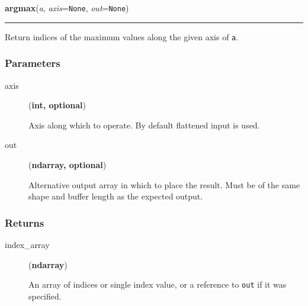     \begin{boxedminipage}{\textwidth}

    \raggedright \textbf{argmax}(\textit{a}, \textit{axis}=\texttt{None}, \textit{out}=\texttt{None})

    \vspace{-1.5ex}

    \rule{\textwidth}{0.5\fboxrule}

Return indices of the maximum values along the given axis of \texttt{a}.



\hypertarget{parameters}{}
\subsubsection*{Parameters}
\begin{description}
\item[{axis}] (\textbf{int, optional})

Axis along which to operate.  By default flattened input is used.

\item[{out}] (\textbf{ndarray, optional})

Alternative output array in which to place the result.  Must
be of the same shape and buffer length as the expected output.

\end{description}



\hypertarget{returns}{}
\subsubsection*{Returns}
\begin{description}
\item[{index{\_}array}] (\textbf{ndarray})

An array of indices or single index value, or a reference to \texttt{out}
if it was specified.

\end{description}



\end{boxedminipage}

